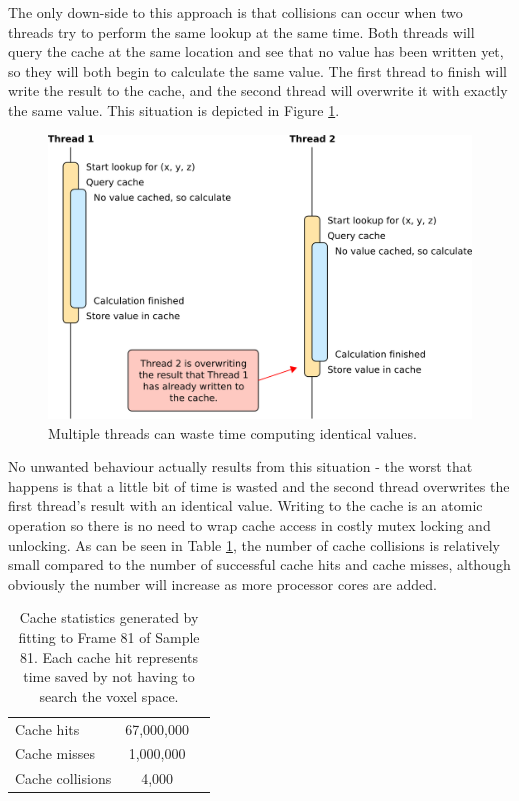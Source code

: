 The only down-side to this approach is that collisions can occur when two threads try to perform the same lookup at the same time.
Both threads will query the cache at the same location and see that no value has been written yet, so they will both begin to calculate the same value.
The first thread to finish will write the result to the cache, and the second thread will overwrite it with exactly the same value.
This situation is depicted in Figure \ref{CacheCollisions}.

\begin{figure}[tb]
	\centering
	\includegraphics[width=\textwidth]{cachecollisions.png}
	\caption{Multiple threads can waste time computing identical values.}
	\label{CacheCollisions}
\end{figure}

No unwanted behaviour actually results from this situation - the worst that happens is that a little bit of time is wasted and the second thread overwrites the first thread's result with an identical value.
Writing to the cache is an atomic operation so there is no need to wrap cache access in costly mutex locking and unlocking.
As can be seen in Table \ref{CacheStatsTable}, the number of cache collisions is relatively small compared to the number of successful cache hits and cache misses, although obviously the number will increase as more processor cores are added.

\begin{table}[thb]
	\centering
	\begin{tabular}{|l|c|c|}
		\hline
		Cache hits & 67,000,000 \\
		Cache misses & 1,000,000 \\
		Cache collisions & 4,000 \\
		\hline
	\end{tabular}
	\caption{Cache statistics generated by fitting to Frame 81 of Sample 81.
		Each cache hit represents time saved by not having to search the voxel space.}
	\label{CacheStatsTable}
\end{table}

